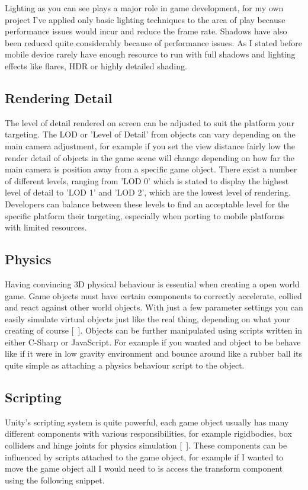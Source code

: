 Lighting as you can see plays a major role in game development, for my own project I've applied only basic lighting techniques to the area of play because performance issues would incur and reduce the frame rate. Shadows have also been reduced quite considerably because of performance issues. As I stated before mobile device rarely have enough resource to run with full shadows and lighting effects like flares, HDR or highly detailed shading.
\subsection{Rendering Detail}
The level of detail rendered on screen can be adjusted to suit the platform your targeting. The LOD or 'Level of Detail' from objects can vary depending on the main camera adjustment, for example if you set the view distance fairly low the render detail of objects in the game scene will change depending on how far the main camera is position away from a specific game object. There exist a number of different levels, ranging from 'LOD 0' which is stated to display the highest level of detail to 'LOD 1' and 'LOD 2', which are the lowest level of rendering. Developers can balance between these levels to find an acceptable level for the specific platform their targeting, especially when porting to mobile platforms with limited resources.
\subsection{Physics}
Having convincing 3D physical behaviour is essential when creating a open world game. Game objects must have certain components to correctly accelerate, collied and react against other world objects. With just a few parameter settings you can easily simulate virtual objects just like the real thing, depending on what your creating of course [~\cite{Physics}]. Objects can be further manipulated using scripts written in either C-Sharp or JavaScript. For example if you wanted and object to be behave like if it were in low gravity environment and bounce around like a rubber ball its quite simple as attaching a physics behaviour script to the object. 
\subsection{Scripting}
Unity's scripting system is quite powerful, each game object usually has many different components with various responsibilities, for example rigidbodies, box colliders and hinge joints for physics simulation [~\cite{Scripting}]. These components can be influenced by scripts attached to the game object, for example if I wanted to move the game object all I would need to is access the transform component using the following snippet.

